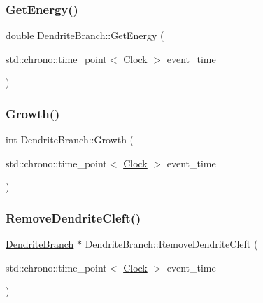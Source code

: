 \mbox{\label{classDendriteBranch_afab2dd907fba115c3483cd9a217ccec0}} 
\subsubsection{\texorpdfstring{Get\+Energy()}{GetEnergy()}}
{\footnotesize\ttfamily double Dendrite\+Branch\+::\+Get\+Energy (\begin{DoxyParamCaption}\item[{std\+::chrono\+::time\+\_\+point$<$ \mbox{\hyperlink{universe_8h_a0ef8d951d1ca5ab3cfaf7ab4c7a6fd80}{Clock}} $>$}]{event\+\_\+time }\end{DoxyParamCaption})\hspace{0.3cm}{\ttfamily [inline]}}

\mbox{\label{classDendriteBranch_a4b950ef8a0856a11240d353bcfd1fba4}} 
\subsubsection{\texorpdfstring{Growth()}{Growth()}}
{\footnotesize\ttfamily int Dendrite\+Branch\+::\+Growth (\begin{DoxyParamCaption}\item[{std\+::chrono\+::time\+\_\+point$<$ \mbox{\hyperlink{universe_8h_a0ef8d951d1ca5ab3cfaf7ab4c7a6fd80}{Clock}} $>$}]{event\+\_\+time }\end{DoxyParamCaption})}

\mbox{\label{classDendriteBranch_afaca221cb4bba98e56f11b0f9e6370b5}} 
\subsubsection{\texorpdfstring{Remove\+Dendrite\+Cleft()}{RemoveDendriteCleft()}}
{\footnotesize\ttfamily \mbox{\hyperlink{classDendriteBranch}{Dendrite\+Branch}} $\ast$ Dendrite\+Branch\+::\+Remove\+Dendrite\+Cleft (\begin{DoxyParamCaption}\item[{std\+::chrono\+::time\+\_\+point$<$ \mbox{\hyperlink{universe_8h_a0ef8d951d1ca5ab3cfaf7ab4c7a6fd80}{Clock}} $>$}]{event\+\_\+time }\end{DoxyParamCaption})}

